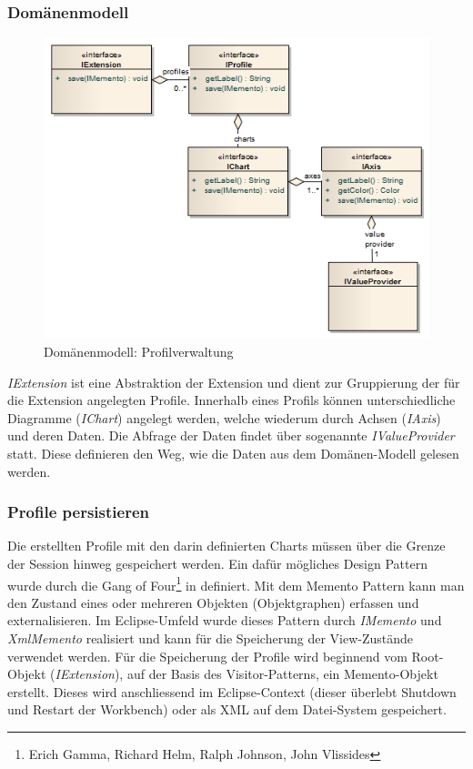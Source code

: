 \subsubsection{Domänenmodell}
 \begin{figure}[H]
  	\centering
        	\caption{Domänenmodell: Profilverwaltung}
    	\includegraphics[width=13cm]{images/core_domain_profiles}
\end{figure}
\textit{IExtension} ist eine Abstraktion der Extension und dient zur Gruppierung der für die Extension angelegten Profile. Innerhalb eines Profils können unterschiedliche Diagramme (\textit{IChart}) angelegt werden, welche wiederum durch Achsen (\textit{IAxis}) und deren Daten. Die Abfrage der Daten findet über sogenannte \textit{IValueProvider} statt. Diese definieren den Weg, wie die Daten aus dem Domänen-Modell gelesen werden.

\subsubsection{Profile persistieren}
Die erstellten Profile mit den darin definierten Charts müssen über die Grenze der Session hinweg gespeichert werden. Ein dafür mögliches Design Pattern wurde durch die Gang of Four\footnote{Erich Gamma, Richard Helm, Ralph Johnson, John Vlissides} in \cite[S. 283]{gamma1995design} definiert. Mit dem Memento Pattern kann man den Zustand eines oder mehreren Objekten (Objektgraphen) erfassen und externalisieren. Im Eclipse-Umfeld wurde dieses Pattern durch \textit{IMemento} und \textit{XmlMemento} realisiert und kann für die Speicherung der View-Zustände verwendet werden. Für die Speicherung der Profile wird beginnend vom Root-Objekt (\textit{IExtension}), auf der Basis des Visitor-Patterns\cite[S. 331]{gamma1995design}, ein Memento-Objekt erstellt. Dieses wird anschliessend im Eclipse-Context (dieser überlebt Shutdown und Restart der Workbench) oder als XML auf dem Datei-System gespeichert. 



